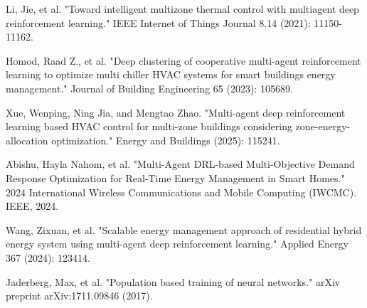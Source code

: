 \documentclass[preprint,12pt]{elsarticle}
\begin{document}
\begin{thebibliography}{16}
Li, Jie, et al. "Toward intelligent multizone thermal control with multiagent deep reinforcement learning." IEEE Internet of Things Journal 8.14 (2021): 11150-11162.

Homod, Raad Z., et al. "Deep clustering of cooperative multi-agent reinforcement learning to optimize multi chiller HVAC systems for smart buildings energy management." Journal of Building Engineering 65 (2023): 105689.

Xue, Wenping, Ning Jia, and Mengtao Zhao. "Multi-agent deep reinforcement learning based HVAC control for multi-zone buildings considering zone-energy-allocation optimization." Energy and Buildings (2025): 115241.

Abishu, Hayla Nahom, et al. "Multi-Agent DRL-based Multi-Objective Demand Response Optimization for Real-Time Energy Management in Smart Homes." 2024 International Wireless Communications and Mobile Computing (IWCMC). IEEE, 2024.   

Wang, Zixuan, et al. "Scalable energy management approach of residential hybrid energy system using multi-agent deep reinforcement learning." Applied Energy 367 (2024): 123414.

Jaderberg, Max, et al. "Population based training of neural networks." arXiv preprint arXiv:1711.09846 (2017).

\end{thebibliography}
\end{document}
